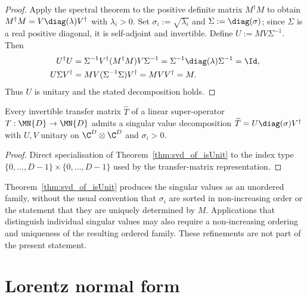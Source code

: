 \begin{proof}\leanok
    Apply the spectral theorem to the positive definite matrix
    $M^{\dagger}M$ to obtain
    $M^{\dagger}M=V\diag(\lambda)V^{\dagger}$ with $\lambda_i>0$.
    Set $\sigma_i:=\sqrt{\lambda_i}$ and $\Sigma:=\diag(\sigma)$; since
    $\Sigma$ is a real positive diagonal, it is self-adjoint and invertible.
    Define $U:=MV\Sigma^{-1}$. Then
    \begin{align}
        U^{\dagger}U
        &= \Sigma^{-1}V^{\dagger}(M^{\dagger}M)V\Sigma^{-1}
         = \Sigma^{-1}\diag(\lambda)\Sigma^{-1}
         = \Id,
        \notag\\
        U\Sigma V^{\dagger}
        &= MV(\Sigma^{-1}\Sigma)V^{\dagger}
         = MVV^{\dagger}
         = M.
        \notag
    \end{align}
    Thus $U$ is unitary and the stated decomposition holds.
\end{proof}

\begin{theorem}
    \label{thm:transferMatrix_svd_of_isUnit}
    \leanok
    Every invertible transfer matrix $\widehat{T}$ of a linear super-operator
    $T : \MN{D} \to \MN{D}$ admits a singular value decomposition
    $\widehat{T}=U\diag(\sigma)V^{\dagger}$ with $U,V$
    unitary on $\C^{D}\otimes\C^{D}$ and $\sigma_i>0$.
\end{theorem}

\begin{proof}\leanok
    Direct specialisation of Theorem~\ref{thm:svd_of_isUnit} to the index type
    $\{0,\ldots,D-1\}\times\{0,\ldots,D-1\}$ used by the transfer-matrix
    representation.
\end{proof}

\begin{remark}
    Theorem~\ref{thm:svd_of_isUnit} produces the singular values as an
    unordered family, without the usual convention that $\sigma_i$ are sorted
    in non-increasing order or the statement that they are uniquely determined
    by $M$. Applications that distinguish individual singular values may also
    require a non-increasing ordering and uniqueness of the resulting ordered
    family. These refinements are not part of the present statement.
\end{remark}

\section{Lorentz normal form}
\label{sec:lorentz_normal_form}

